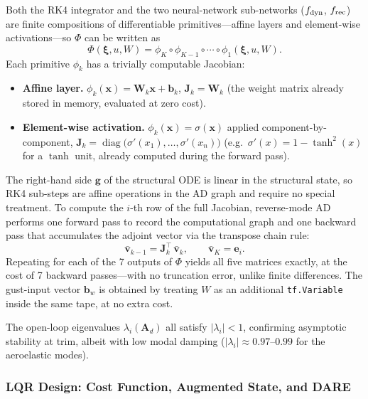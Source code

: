 \documentclass[11pt,a4paper]{article}
\newcommand{\vxi}{\bm{\xi}}
\newcommand{\mA}{\mathbf{A}}
\begin{document}
Both the RK4 integrator and the two neural-network sub-networks ($f_{\rm dyn}$,
$f_{\rm rec}$) are finite compositions of differentiable primitives---affine
layers and element-wise activations---so $\Phi$ can be written as
\begin{equation}
  \Phi(\vxi, u, W)
  = \phi_K \circ \phi_{K-1} \circ \cdots \circ \phi_1(\vxi, u, W).
  \label{eq:chain}
\end{equation}
Each primitive $\phi_k$ has a trivially computable Jacobian:
\begin{itemize}
  \item \textbf{Affine layer.}
        $\phi_k(\mathbf{x}) = \mathbf{W}_k\mathbf{x} + \mathbf{b}_k$,\quad
        $\mathbf{J}_k = \mathbf{W}_k$
        (the weight matrix already stored in memory, evaluated at zero cost).
  \item \textbf{Element-wise activation.}
        $\phi_k(\mathbf{x}) = \sigma(\mathbf{x})$ applied component-by-component,\quad
        $\mathbf{J}_k = \operatorname{diag}\!\bigl(\sigma'(x_1),\ldots,\sigma'(x_n)\bigr)$
        (e.g.\ $\sigma'(x)=1-\tanh^2(x)$ for a $\tanh$ unit, already computed
        during the forward pass).
\end{itemize}
The right-hand side $\bm{g}$ of the structural ODE is linear in the structural
state, so RK4 sub-steps are affine operations in the AD graph and require no
special treatment.
To compute the $i$-th row of the full Jacobian, reverse-mode AD performs one
forward pass to record the computational graph and one backward pass that
accumulates the adjoint vector via the transpose chain rule:
\begin{equation}
  \bar{\mathbf{v}}_{k-1} = \mathbf{J}_k^\top\,\bar{\mathbf{v}}_k,
  \qquad \bar{\mathbf{v}}_K = \mathbf{e}_i.
  \label{eq:adjoint}
\end{equation}
Repeating for each of the 7 outputs of $\Phi$ yields all five matrices exactly,
at the cost of 7 backward passes---with no truncation error, unlike finite
differences.
The gust-input vector $\mathbf{b}_w$ is obtained by treating $W$ as an
additional \texttt{tf.Variable} inside the same tape, at no extra cost.

The open-loop eigenvalues $\lambda_i(\mA_d)$ all satisfy $|\lambda_i| < 1$,
confirming asymptotic stability at trim, albeit with low modal damping
($|\lambda_i| \approx 0.97$--$0.99$ for the aeroelastic modes).

\subsubsection{LQR Design: Cost Function, Augmented State, and DARE}
\label{sec:lqr}
\end{document}
